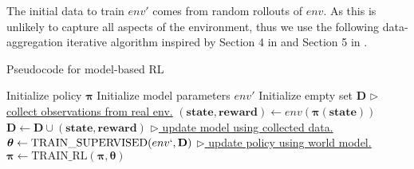 The initial data to train $env'$ comes from random rollouts of $env$. As this is unlikely to capture all aspects of the environment, thus we use the following data-aggregation iterative algorithm inspired by Section 4 in  \cite{trpo_ensemble} and Section 5 in \cite{world_models}.

\begin{algorithm}[H]
\caption{Pseudocode for model-based RL}\label{dpll}
\begin{algorithmic}
\STATE Initialize policy $\boldsymbol\pi$
\STATE Initialize model parameters $env'$
\STATE Initialize empty set $\mathbf{D}$
\STATE \underline{$\triangleright$ collect observations from real env.}
\STATE $(\mathbf{state},\mathbf{reward}) \gets env(\boldsymbol\pi(\mathbf{state}))$
\STATE $\mathbf{D} \gets \mathbf{D} \cup (\mathbf{state},\mathbf{reward})$
\ENDWHILE
\STATE \underline{$\triangleright$ update model using collected data.}
\STATE $\boldsymbol\theta \gets \text{TRAIN\_SUPERVISED}(env`, \mathbf{D})$
\STATE \underline{$\triangleright$ update policy using world model.}
\STATE $\boldsymbol\pi \gets \text{TRAIN\_RL}(\boldsymbol\pi, \boldsymbol\theta)$
\ENDWHILE
\end{algorithmic}
\label{basic_loop}
\label{alg:basic_loop}
\end{algorithm}
